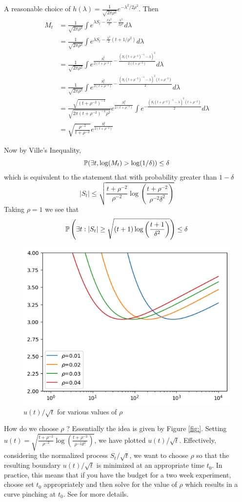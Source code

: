 A reasonable choice of $h(\lambda) = \frac{1}{\sqrt{2\pi \rho^2}} e^{-\lambda^2/2\rho^2}$. Then
\begin{align*}
    M_t
    &= \frac{1}{\sqrt{2\pi \rho^2}} \int e^{\lambda S_t - \frac{t\lambda^2}{2} - \frac{\lambda^2}{2\rho^2} } d\lambda \\
    &= \frac{1}{\sqrt{2\pi \rho^2}} \int e^{\lambda S_t - \frac{\lambda^2}{2}(t+1/\rho^{2})} d\lambda\\
    &= \frac{1}{\sqrt{2\pi \rho^2}} \int e^{\frac{S_t^2}{2(t+\rho^{-2})} - \frac{(S_t(t+\rho^{-2})^{-1}-\lambda)^2}{2(t+\rho^{-2})}} d\lambda \\
    &= \frac{1}{\sqrt{2\pi \rho^2}} \int e^{\frac{S_t^2}{2(t+\rho^{-2})} - \frac{(S_t(t+\rho^{-2})^{-1}-\lambda)^2(t+\rho^{-2})}{2}} d\lambda \\
    &= \frac{\sqrt{(t+\rho^{-2})^{-1}}}{\sqrt{2\pi (t+\rho^{-2})^{-1} \rho^2}} e^{\frac{S_t^2}{2(t+\rho^{-2})}}\int e^{- \frac{(S_t(t+\rho^{-2})^{-1}-\lambda)^2(t+\rho^{-2})}{2}} d\lambda \\
    &= \sqrt{\frac{\rho^{-2}}{t+\rho^{-2}}} e^{\frac{S_t^2}{2(t+\rho^{-2})}}
\end{align*}

Now by Ville's Inequality, 
\[\P(\exists t, \log(M_t) > \log(1/\delta) )\leq \delta\]
which is equivalent to the statement that with probability greater than $1-\delta$
\[|S_t| \leq \sqrt{\frac{t + \rho^{-2}}{\rho^{-2}}\log\left(\frac{t+\rho^{-2}}{\rho^{-2} \delta^2}\right)}\]
Taking $\rho = 1$ we see that 
\[\P\left(\exists t: |S_t| \geq \sqrt{(t+1)\log\left(\frac{t+1}{\delta^2}\right)}\right) \leq \delta\]

\begin{figure}
    \centering
    \includegraphics[width=.5\linewidth]{sprt.png}
    \caption{$u(t)/\sqrt{t}$ for various values of $\rho$}
    \label{fig:my_label}
\end{figure}

How do we choose $\rho$ ? Essentially the idea is given by Figure \ref{fig:}. Setting $u(t) = \sqrt{\frac{t + \rho^{-2}}{\rho^{-2}}\log\left(\frac{t+\rho^{-2}}{\rho^{-2} \delta^2}\right)}$, we have plotted $u(t)/\sqrt{t}$. Effectively, considering the normalized process $S_t/\sqrt{t}$, we want to choose $\rho$ so that the resulting boundary $u(t)/\sqrt{t}$ is minimized at an appropriate time $t_0$. In practice, this means that if you have the budget for a two week experiment, choose set $t_0$ appropriately and then solve for the value of $\rho$ which results in a curve pinching at $t_0$. See \cite{howard2021time} for more details. 


